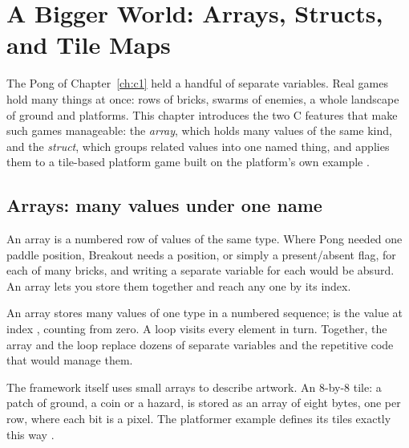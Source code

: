 \chapter{A Bigger World: Arrays, Structs, and Tile Maps}
\label{ch:c2}

The Pong of Chapter~\ref{ch:c1} held a handful of separate variables. Real games
hold many things at once: rows of bricks, swarms of enemies, a whole landscape of
ground and platforms. This chapter introduces the two C features that make such
games manageable: the \emph{array}, which holds many values of the same kind, and
the \emph{struct}, which groups related values into one named thing, and applies
them to a tile-based platform game built on the platform's own example
\citep{prg32repo,prg32tutorialc}.

\section{Arrays: many values under one name}

An array is a numbered row of values of the same type. Where Pong needed one
paddle position, Breakout needs a position, or simply a present/absent flag, for
each of many bricks, and writing a separate variable for each would be absurd. An
array lets you store them together and reach any one by its index.



\begin{prgconcept}
An array stores many values of one type in a numbered sequence; 
is the value at index , counting from zero. A  loop visits every
element in turn. Together, the array and the loop replace dozens of separate
variables and the repetitive code that would manage them.
\end{prgconcept}

The framework itself uses small arrays to describe artwork. An 8-by-8 tile: a
patch of ground, a coin or a hazard, is stored as an array of eight bytes, one per
row, where each bit is a pixel. The platformer example defines its tiles exactly
this way \citep{prg32repo}.



